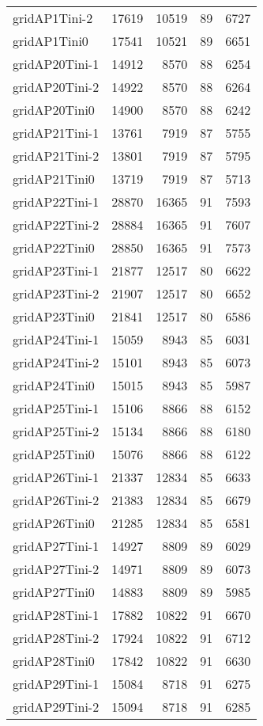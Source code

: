 \documentclass[../../../thesis.tex]{subfiles}
\begin{document}
\begin{longtable}{lrrrr}
gridAP1Tini-2 & 17619 & 10519 & 89 & 6727 \\
gridAP1Tini0 & 17541 & 10521 & 89 & 6651 \\
gridAP20Tini-1 & 14912 & 8570 & 88 & 6254 \\
gridAP20Tini-2 & 14922 & 8570 & 88 & 6264 \\
gridAP20Tini0 & 14900 & 8570 & 88 & 6242 \\
gridAP21Tini-1 & 13761 & 7919 & 87 & 5755 \\
gridAP21Tini-2 & 13801 & 7919 & 87 & 5795 \\
gridAP21Tini0 & 13719 & 7919 & 87 & 5713 \\
gridAP22Tini-1 & 28870 & 16365 & 91 & 7593 \\
gridAP22Tini-2 & 28884 & 16365 & 91 & 7607 \\
gridAP22Tini0 & 28850 & 16365 & 91 & 7573 \\
gridAP23Tini-1 & 21877 & 12517 & 80 & 6622 \\
gridAP23Tini-2 & 21907 & 12517 & 80 & 6652 \\
gridAP23Tini0 & 21841 & 12517 & 80 & 6586 \\
gridAP24Tini-1 & 15059 & 8943 & 85 & 6031 \\
gridAP24Tini-2 & 15101 & 8943 & 85 & 6073 \\
gridAP24Tini0 & 15015 & 8943 & 85 & 5987 \\
gridAP25Tini-1 & 15106 & 8866 & 88 & 6152 \\
gridAP25Tini-2 & 15134 & 8866 & 88 & 6180 \\
gridAP25Tini0 & 15076 & 8866 & 88 & 6122 \\
gridAP26Tini-1 & 21337 & 12834 & 85 & 6633 \\
gridAP26Tini-2 & 21383 & 12834 & 85 & 6679 \\
gridAP26Tini0 & 21285 & 12834 & 85 & 6581 \\
gridAP27Tini-1 & 14927 & 8809 & 89 & 6029 \\
gridAP27Tini-2 & 14971 & 8809 & 89 & 6073 \\
gridAP27Tini0 & 14883 & 8809 & 89 & 5985 \\
gridAP28Tini-1 & 17882 & 10822 & 91 & 6670 \\
gridAP28Tini-2 & 17924 & 10822 & 91 & 6712 \\
gridAP28Tini0 & 17842 & 10822 & 91 & 6630 \\
gridAP29Tini-1 & 15084 & 8718 & 91 & 6275 \\
gridAP29Tini-2 & 15094 & 8718 & 91 & 6285 \\

\end{longtable}
\end{document}
